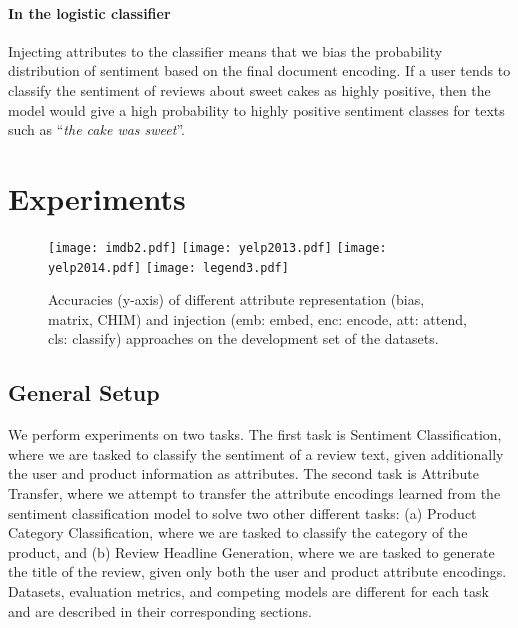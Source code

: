 \documentclass[11pt,a4paper]{article}
\begin{document}
\paragraph{In the logistic classifier}

Injecting attributes to the classifier means that we bias the probability distribution of sentiment based on the final document encoding. If a user tends to classify the sentiment of reviews about sweet cakes as highly positive, then the model would give a high probability to highly positive sentiment classes for texts such as ``\textit{the cake was sweet}''.

\section{Experiments}
\label{sec:experiments}

\begin{figure}[t]
    \centering
    \texttt{[image: imdb2.pdf]}
    \texttt{[image: yelp2013.pdf]}
    \texttt{[image: yelp2014.pdf]}
    \texttt{[image: legend3.pdf]}
    \caption{Accuracies (y-axis) of different attribute representation (bias, matrix, CHIM) and injection (emb: embed, enc: encode, att: attend, cls: classify) approaches on the development set of the datasets.}
    \label{fig:dev_set}
\end{figure}

\subsection{General Setup}

We perform experiments on two tasks. The first task is Sentiment Classification, where we are tasked to classify the sentiment of a review text, given additionally the user and product information as attributes. The second task is Attribute Transfer, where we attempt to transfer the attribute encodings learned from the sentiment classification model to solve two other different tasks: (a) Product Category Classification, where we are tasked to classify the category of the product, and (b) Review Headline Generation, where we are tasked to generate the title of the review, given only both the user and product attribute encodings. Datasets, evaluation metrics, and competing models are different for each task and are described in their corresponding sections.
\end{document}
